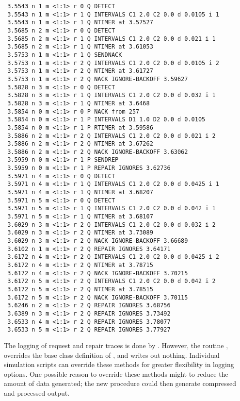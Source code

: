 {\small
\begin{verbatim}
 3.5543 n 1 m <1:1> r 0 Q DETECT
 3.5543 n 1 m <1:1> r 1 Q INTERVALS C1 2.0 C2 0.0 d 0.0105 i 1
 3.5543 n 1 m <1:1> r 1 Q NTIMER at 3.57527
 3.5685 n 2 m <1:1> r 0 Q DETECT
 3.5685 n 2 m <1:1> r 1 Q INTERVALS C1 2.0 C2 0.0 d 0.021 i 1
 3.5685 n 2 m <1:1> r 1 Q NTIMER at 3.61053
 3.5753 n 1 m <1:1> r 1 Q SENDNACK
 3.5753 n 1 m <1:1> r 2 Q INTERVALS C1 2.0 C2 0.0 d 0.0105 i 2
 3.5753 n 1 m <1:1> r 2 Q NTIMER at 3.61727
 3.5753 n 1 m <1:1> r 2 Q NACK IGNORE-BACKOFF 3.59627
 3.5828 n 3 m <1:1> r 0 Q DETECT
 3.5828 n 3 m <1:1> r 1 Q INTERVALS C1 2.0 C2 0.0 d 0.032 i 1
 3.5828 n 3 m <1:1> r 1 Q NTIMER at 3.6468
 3.5854 n 0 m <1:1> r 0 P NACK from 257
 3.5854 n 0 m <1:1> r 1 P INTERVALS D1 1.0 D2 0.0 d 0.0105
 3.5854 n 0 m <1:1> r 1 P RTIMER at 3.59586
 3.5886 n 2 m <1:1> r 2 Q INTERVALS C1 2.0 C2 0.0 d 0.021 i 2
 3.5886 n 2 m <1:1> r 2 Q NTIMER at 3.67262
 3.5886 n 2 m <1:1> r 2 Q NACK IGNORE-BACKOFF 3.63062
 3.5959 n 0 m <1:1> r 1 P SENDREP
 3.5959 n 0 m <1:1> r 1 P REPAIR IGNORES 3.62736
 3.5971 n 4 m <1:1> r 0 Q DETECT
 3.5971 n 4 m <1:1> r 1 Q INTERVALS C1 2.0 C2 0.0 d 0.0425 i 1
 3.5971 n 4 m <1:1> r 1 Q NTIMER at 3.68207
 3.5971 n 5 m <1:1> r 0 Q DETECT
 3.5971 n 5 m <1:1> r 1 Q INTERVALS C1 2.0 C2 0.0 d 0.042 i 1
 3.5971 n 5 m <1:1> r 1 Q NTIMER at 3.68107
 3.6029 n 3 m <1:1> r 2 Q INTERVALS C1 2.0 C2 0.0 d 0.032 i 2
 3.6029 n 3 m <1:1> r 2 Q NTIMER at 3.73089
 3.6029 n 3 m <1:1> r 2 Q NACK IGNORE-BACKOFF 3.66689
 3.6102 n 1 m <1:1> r 2 Q REPAIR IGNORES 3.64171
 3.6172 n 4 m <1:1> r 2 Q INTERVALS C1 2.0 C2 0.0 d 0.0425 i 2
 3.6172 n 4 m <1:1> r 2 Q NTIMER at 3.78715
 3.6172 n 4 m <1:1> r 2 Q NACK IGNORE-BACKOFF 3.70215
 3.6172 n 5 m <1:1> r 2 Q INTERVALS C1 2.0 C2 0.0 d 0.042 i 2
 3.6172 n 5 m <1:1> r 2 Q NTIMER at 3.78515
 3.6172 n 5 m <1:1> r 2 Q NACK IGNORE-BACKOFF 3.70115
 3.6246 n 2 m <1:1> r 2 Q REPAIR IGNORES 3.68756
 3.6389 n 3 m <1:1> r 2 Q REPAIR IGNORES 3.73492
 3.6533 n 4 m <1:1> r 2 Q REPAIR IGNORES 3.78077
 3.6533 n 5 m <1:1> r 2 Q REPAIR IGNORES 3.77927
\end{verbatim}
The logging of request and repair traces is done by
.
However, the routine
,
overrides the base class definition of ,
and writes out nothing.
Individual simulation scripts can override these methods
for greater flexibility in logging options.
One possible reason to override these methods might to
reduce the amount of data generated;
the new procedure could then generate compressed and processed output.

}
